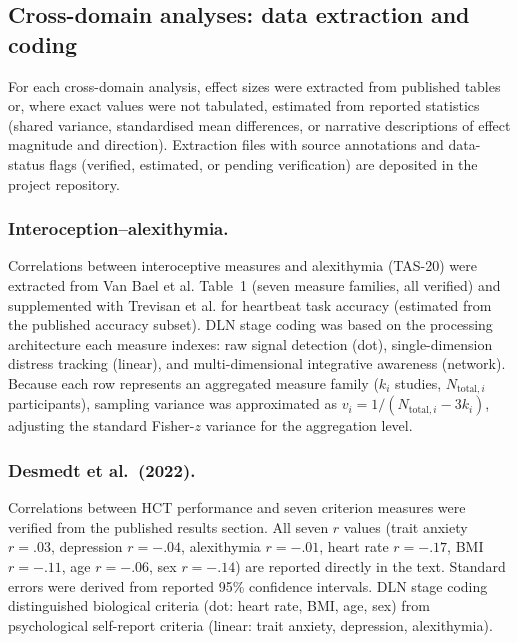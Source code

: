 \documentclass[11pt]{article}
\begin{document}
\subsection{Cross-domain analyses: data extraction and coding}

For each cross-domain analysis, effect sizes were extracted from
published tables or, where exact values were not tabulated, estimated
from reported statistics (shared variance, standardised mean
differences, or narrative descriptions of effect magnitude and
direction). Extraction files with source annotations and data-status
flags (verified, estimated, or pending verification) are deposited in
the project repository.

\subsubsection*{Interoception--alexithymia.}
Correlations between interoceptive measures and alexithymia (TAS-20)
were extracted from Van Bael et al.\cite{VanBael2024} Table~1 (seven
measure families, all verified) and supplemented with Trevisan et
al.\cite{Trevisan2019} for heartbeat task accuracy (estimated from
the published accuracy subset). DLN stage coding was based on the
processing architecture each measure indexes: raw signal detection
(dot), single-dimension distress tracking (linear), and
multi-dimensional integrative awareness (network). Because each row
represents an aggregated measure family ($k_i$ studies,
$N_{\text{total},i}$ participants), sampling variance was approximated
as $v_i = 1/(N_{\text{total},i} - 3k_i)$, adjusting the standard
Fisher-$z$ variance for the aggregation level.

\subsubsection*{Desmedt et al.\ (2022).}
Correlations between HCT performance and seven criterion measures were
verified from the published results section. All seven $r$ values
(trait anxiety $r = .03$, depression $r = -.04$, alexithymia
$r = -.01$, heart rate $r = -.17$, BMI $r = -.11$, age $r = -.06$,
sex $r = -.14$) are reported directly in the text. Standard errors
were derived from reported 95\% confidence intervals. DLN stage coding
distinguished biological criteria (dot: heart rate, BMI, age, sex)
from psychological self-report criteria (linear: trait anxiety,
depression, alexithymia).
\end{document}
